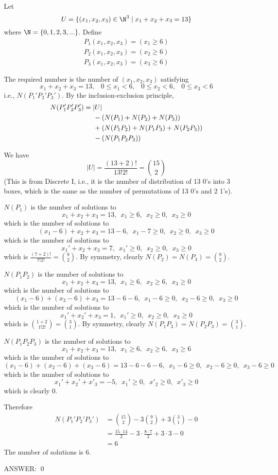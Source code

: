 
Let 
\[
U = \{(x_1, x_2, x_3) \in \N^3 \mid x_1 + x_2 + x_3 = 13 \}
\]
where $\N = \{0, 1, 2, 3, ...\}$.
Define
\begin{align*}
P_1(x_1, x_2, x_3) = (x_1 \geq 6) \\
P_2(x_1, x_2, x_3) = (x_2 \geq 6) \\
P_3(x_1, x_2, x_3) = (x_3 \geq 6) 
\end{align*}

The required number is the number of $(x_1, x_2, x_3)$
satisfying 
\[
x_1 + x_2 + x_3 = 13, \,\,\,\,\,
0 \leq x_1 < 6, \,\,\,\,\,
0 \leq x_2 < 6, \,\,\,\,\,
0 \leq x_3 < 6
\]
i.e., $N(P_1' P_2' P_3')$.
By the inclusion-exclusion principle, 
\begin{align*}
N(P_1' P_2' P_3')
&= |U| \\
&\hspace{0.5cm} - (N(P_1) + N(P_2) + N(P_3)) \\ 
&\hspace{0.5cm} + (N(P_1P_2) + N(P_1P_3) + N(P_2 P_3)) \\ 
&\hspace{0.5cm} - (N(P_1 P_2 P_3))
\end{align*}

We have
\[
|U| = \frac{(13 + 2)!}{13! 2!} = \binom{15}{2}
\]
(This is from Discrete I, i.e., it is the number of distribution
of 13 0's into 3 boxes, which is the same as the number of 
permutations of 13 0's and 2 1's).

$N(P_1)$ is the number of solutions to
\[
x_1 + x_2 + x_3 = 13, \,\,\, x_1 \geq 6, \,\,\, x_2 \geq 0, \,\,\, x_3 \geq 0
\]
which is the number of solutions to 
\[
(x_1 - 6) + x_2 + x_3 = 13 - 6, \,\,\, x_1 - 7 \geq 0, \,\,\, x_2 \geq 0, \,\,\, x_3 \geq 0
\]
which is the number of solutions to 
\[
x_1' + x_2 + x_3 = 7, \,\,\, x_1' \geq 0, \,\,\, x_2 \geq 0, \,\,\, x_3 \geq 0
\]
which is $\frac{(7 + 2)!}{7! 2!} = \binom{9}{2}$.
By symmetry, clearly $N(P_2) = N(P_3) = \binom{9}{2}$.


$N(P_1P_2)$ is the number of solutions to
\[
x_1 + x_2 + x_3 = 13, \,\,\, x_1 \geq 6, \,\,\, x_2 \geq 6, \,\,\, x_3 \geq 0
\]
which is the number of solutions to 
\[
(x_1 - 6) + (x_2 - 6) + x_3 = 13 - 6 - 6, \,\,\, x_1 - 6 \geq 0, \,\,\, x_2 - 6 \geq 0, \,\,\, x_3 \geq 0
\]
which is the number of solutions to 
\[
x_1' + x_2' + x_3 = 1, \,\,\, x_1' \geq 0, \,\,\, x_2 \geq 0, \,\,\, x_3 \geq 0
\]
which is $\binom{1 + 2}{1! 2!} = \binom{3}{1}$.
By symmetry, clearly $N(P_1P_3) = N(P_2P_3) = \binom{3}{1}$.

$N(P_1 P_2 P_3)$ is the number of solutions to
\[
x_1 + x_2 + x_3 = 13, \,\,\, x_1 \geq 6, \,\,\, x_2 \geq 6, \,\,\, x_3 \geq 6
\]
which is the number of solutions to 
\[
(x_1 - 6) + (x_2 - 6) + (x_3-6) = 13 - 6 - 6 - 6, \,\,\, x_1 - 6 \geq 0, \,\,\, x_2 - 6 \geq 0, \,\,\, x_3 - 6\geq 0
\]
which is the number of solutions to 
\[
x_1' + x_2' + x'_3 = -5, \,\,\, x_1' \geq 0, \,\,\, x'_2 \geq 0, \,\,\, x'_3 \geq 0
\]
which is clearly 0.


Therefore
\begin{align*}
N(P_1' P_2' P_3')
&= \binom{15}{2} - 3 \binom{9}{2}  + 3 \binom{3}{1} - 0 \\
&= \frac{15 \cdot 14}{2} - 3 \cdot \frac{8 \cdot 7}{2} + 3 \cdot 3 - 0\\
&= 6
\end{align*}
The number of solutions is 6.

ANSWER:
\qed
